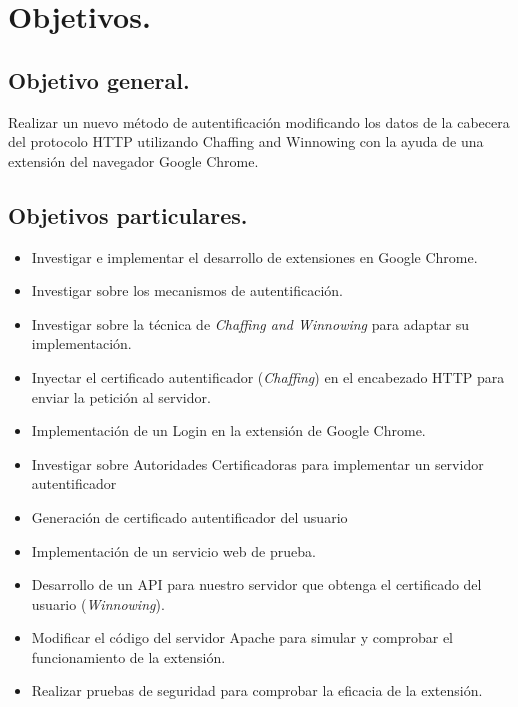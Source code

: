 \documentclass[12pt, a4paper, titlepage]{report}
\begin{document}
    	\section{Objetivos.}
    		\subsection{Objetivo general. }
    			Realizar un nuevo método de autentificación modificando los datos de la cabecera del protocolo HTTP utilizando Chaffing and Winnowing con la ayuda de una extensión del navegador Google Chrome.
    		\subsection{Objetivos particulares.}
    			\begin{itemize}
    				\item Investigar e implementar el desarrollo de extensiones en Google Chrome.
    				\item Investigar sobre los mecanismos de autentificación.
    				\item Investigar sobre la técnica de \textit{Chaffing and Winnowing} para adaptar su implementación.
    				\item Inyectar el certificado autentificador (\textit{Chaffing}) en el encabezado HTTP para enviar la petición al servidor. 
    				\item Implementación de un Login en la extensión de Google Chrome.
    				\item Investigar sobre Autoridades Certificadoras para implementar un servidor autentificador
    				\item Generación de certificado autentificador del usuario
    				\item Implementación de un servicio web de prueba.
    				\item Desarrollo de un API para nuestro servidor que obtenga el certificado del usuario (\textit{Winnowing}).
    				\item Modificar el código del servidor Apache para simular y comprobar el funcionamiento de la extensión. 
    				\item Realizar pruebas de seguridad para comprobar la eficacia de la extensión. 
    			\end{itemize}
			
\end{document}
